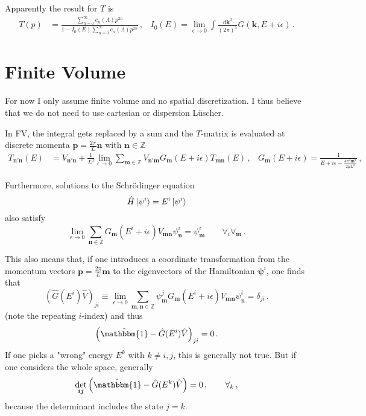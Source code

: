 \documentclass[
    aps,
    prl,
    showkeys,
    nofootinbib,
    floatfix
]{revtex4}
\renewcommand{\vec}[1]{\boldsymbol{#1}}
\begin{document}
Apparently the result for $T$ is 
\begin{align}\label{eq:quantization-separable-physical}
	T(p) &= \frac{\sum_{n=0}^{\infty} {c_n(\Lambda)}  p^{2n} }{1 - I_0(E)\sum_{n=0}^{\infty} {c_n(\Lambda)}  p^{2n} } \, , &
	I_0(E) = \lim\limits_{\epsilon \to 0} \int \frac{d \vec k^3}{(2\pi)^3} G(\vec k, E + i \epsilon)
	\, .
\end{align}

\section{Finite Volume}
For now I only assume finite volume and no spatial discretization.
I thus believe that we do not need to use cartesian or dispersion Lüscher.

In FV, the integral gets replaced by a sum and the $T$-matrix is evaluated at discrete momenta $\vec p = \frac{2 \pi}{L} \vec n$ with $\vec n \in \mathbb Z$
\begin{align}
	T_{\vec n' \vec n}(E)
	&=
	V_{\vec n' \vec n} + \frac{1}{L^3}\lim\limits_{\epsilon \to 0}\sum\limits_{\vec m \in \mathbb Z} V_{\vec n' \vec m} G_{\vec m}( E + i \epsilon) T_{\vec m \vec n}(E) \, ,
	&
	G_{\vec m}(E+ i \epsilon) = \frac{1}{E + i \epsilon - \frac{4 \pi^2 \vec m^2}{2\mu L^2 }}
	\, ,
\end{align}

Furthermore, solutions to the Schrödinger equation
\begin{equation}
	\hat H \ket{\psi^i} = E^i \ket{\psi^i}
\end{equation}
also satisfy
\begin{equation}
	\lim\limits_{\epsilon \to 0}\sum\limits_{\vec n \in \mathbb Z} G_{\vec m}( E^i + i \epsilon) V_{\vec m \vec n} \psi_{\vec n}^i = \psi_{\vec m}^i \qquad \forall _i \forall _{\vec{m}} \, .
\end{equation}

This also means that, if one introduces a coordinate transformation from the momentum vectors $\vec p = \frac{2 \pi}{L} \vec m$ to the eigenvectors of the Hamiltonian $\vec \psi^i$, one finds that
\begin{equation}
	\left(\hat G(E^i) \hat V\right)_{ji}
	\equiv \lim\limits_{\epsilon \to 0}
	\sum\limits_{\vec m, \vec n \in \mathbb Z} \psi_{\vec m}^j G_{\vec m}( E^i + i \epsilon) V_{\vec m \vec n} \psi_{\vec n}^i
	=
	\delta_{ji}\, .
\end{equation}
(note the repeating $i$-index) and thus
\begin{equation}
	\left(\hat{\mathbbm{1}} - \hat G( E^i ) \hat V\right)_{j i} = 0 \, .
\end{equation}
If one picks a "wrong" energy $E^k$  with $k \neq i, j$, this is generally not true.
But if one considers the whole space, generally
\begin{equation}
	\det\limits_{\vec i \vec j} \left(\hat{\mathbbm{1}} - \hat G( E^k ) \hat V\right) = 0 \, , \qquad \forall_k \, ,
\end{equation}
because the determinant includes the state $j = k$.
\end{document}
